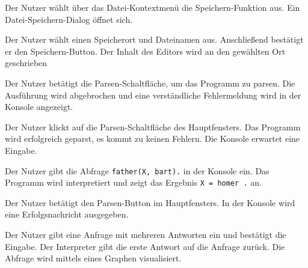 \documentclass[parskip=full,11pt,twoside]{scrartcl}
\begin{document}

{Der Nutzer wählt über das Datei-Kontextmenü die Speichern-Funktion aus.}
{Ein Datei-Speichern-Dialog öffnet sich.}

{Der Nutzer wählt einen Speicherort und Dateinamen aus. Anschließend bestätigt er den Speichern-Button.}
{Der Inhalt des Editors wird an den gewählten Ort geschrieben}



{Der Nutzer betätigt die Parsen-Schaltfläche, um das Programm zu parsen.}
{Die Ausführung wird abgebrochen und eine verständliche Fehlermeldung wird in der Konsole angezeigt.}



{Der Nutzer klickt auf die Parsen-Schaltfläche des Hauptfensters.}
{Das Programm wird erfolgreich geparst, es kommt zu keinen Fehlern. Die Konsole erwartet eine Eingabe.}

{Der Nutzer gibt die Abfrage \texttt{father(X, bart).} in der Konsole ein.}
{Das Programm wird interpretiert und zeigt das Ergebnis \texttt{X = homer .} an.}



{Der Nutzer betätigt den Parsen-Button im Hauptfensters.}
{In der Konsole wird eine Erfolgsnachricht ausgegeben.}

{Der Nutzer gibt eine Anfrage mit mehreren Antworten ein und bestätigt die Eingabe.}
{Der Interpreter gibt die erste Antwort auf die Anfrage zurück. Die Abfrage wird mittels eines Graphen visualisiert.}
\end{document}

